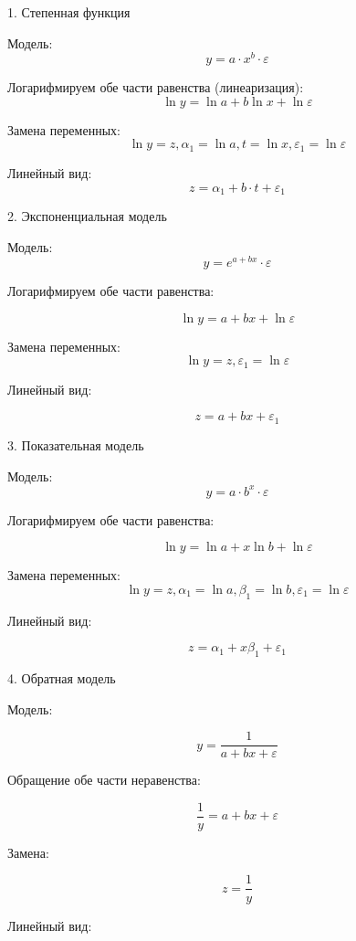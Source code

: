 \documentclass[aps,%
12pt,%
final,%
oneside,
onecolumn,%
musixtex, %
superscriptaddress,%
centertags]{article} %
\begin{document}
\begin{center} 1. Степенная функция \end{center}

Модель:
$$ y = a \cdot x^b \cdot \varepsilon $$

Логарифмируем обе части равенства (линеаризация):
$$ \ln y =\ln a + b\ln x + \ln \varepsilon $$

Замена переменных:
$$ \ln y = z, \alpha_1 = \ln a, t = \ln x, \varepsilon_1 = \ln \varepsilon $$

Линейный вид:
$$ z =\alpha_1 + b \cdot t + \varepsilon_1 $$

\begin{center} 2. Экспоненциальная модель \end{center}

Модель:
$$ y = e^{a+bx} \cdot \varepsilon $$

Логарифмируем обе части равенства:

$$ \ln y = a + bx + \ln \varepsilon$$

Замена переменных:
$$ \ln y = z, \varepsilon_1 = \ln \varepsilon $$

Линейный вид:

$$ z = a + bx + \varepsilon_1 $$

\begin{center} 3. Показательная модель \end{center}

Модель:
$$ y = a \cdot b^x \cdot \varepsilon $$

Логарифмируем обе части равенства:

$$ \ln y = \ln a + x \ln b + \ln \varepsilon$$

Замена переменных:
$$ \ln y = z, \alpha_1 = \ln a, \beta_1 = \ln b, \varepsilon_1 = \ln \varepsilon $$

Линейный вид:

$$ z = \alpha_1 + x\beta_1 + \varepsilon_1 $$

\begin{center} 4. Обратная модель \end{center}

Модель:

$$ y = \frac{1}{a+bx+\varepsilon} $$

Обращение обе части неравенства:

$$ \frac{1}{y} = a + bx + \varepsilon $$

Замена:

$$ z =\frac{1}{y} $$

Линейный вид:
\end{document}
